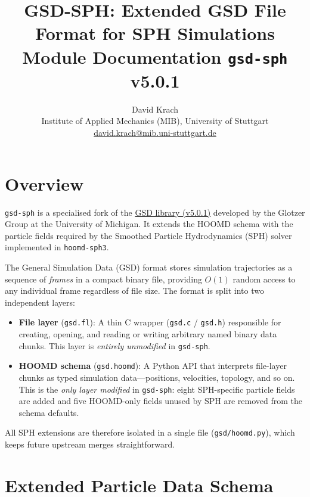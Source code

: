 \documentclass[10pt,a4paper]{article}
\title{\textbf{GSD-SPH: Extended GSD File Format for SPH Simulations}\\[4pt]
       \large Module Documentation \quad \texttt{gsd-sph} v5.0.1}
\author{David Krach\\[2pt]
        Institute of Applied Mechanics (MIB), University of Stuttgart\\
        \href{mailto:david.krach@mib.uni-stuttgart.de}%
             {david.krach@mib.uni-stuttgart.de}}
\date{}
\begin{document}
\maketitle
\thispagestyle{empty}

\section{Overview}

\texttt{gsd-sph} is a specialised fork of the
\href{https://github.com/glotzerlab/gsd}{GSD library (v5.0.1)} developed by
the Glotzer Group at the University of Michigan.  It extends the HOOMD schema
with the particle fields required by the Smoothed Particle Hydrodynamics (SPH)
solver implemented in \texttt{hoomd-sph3}.

The General Simulation Data (GSD) format stores simulation trajectories as a
sequence of \emph{frames} in a compact binary file, providing $O(1)$ random
access to any individual frame regardless of file size.  The format is split
into two independent layers:

\begin{itemize}[itemsep=2pt]
  \item \textbf{File layer} (\texttt{gsd.fl}): A thin C wrapper
        (\texttt{gsd.c} / \texttt{gsd.h}) responsible for creating, opening,
        and reading or writing arbitrary named binary data chunks.  This layer
        is \emph{entirely unmodified} in \texttt{gsd-sph}.
  \item \textbf{HOOMD schema} (\texttt{gsd.hoomd}): A Python API that
        interprets file-layer chunks as typed simulation data---positions,
        velocities, topology, and so on.  This is the \emph{only layer
        modified} in \texttt{gsd-sph}: eight SPH-specific particle fields are
        added and five HOOMD-only fields unused by SPH are removed from the
        schema defaults.
\end{itemize}

All SPH extensions are therefore isolated in a single file (\texttt{gsd/hoomd.py}),
which keeps future upstream merges straightforward.

\section{Extended Particle Data Schema}
\end{document}
